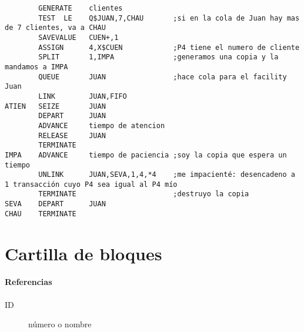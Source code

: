 \documentclass[12pt, a4paper, twoside]{paquetes-apunte/apunte}
\begin{document}
\begin{lstlisting}
        GENERATE    clientes
        TEST  LE    Q$JUAN,7,CHAU       ;si en la cola de Juan hay mas de 7 clientes, va a CHAU
        SAVEVALUE   CUEN+,1
        ASSIGN      4,X$CUEN            ;P4 tiene el numero de cliente
        SPLIT       1,IMPA              ;generamos una copia y la mandamos a IMPA
        QUEUE       JUAN                ;hace cola para el facility Juan
        LINK        JUAN,FIFO
ATIEN   SEIZE       JUAN
        DEPART      JUAN
        ADVANCE     tiempo de atencion
        RELEASE     JUAN
        TERMINATE
IMPA    ADVANCE     tiempo de paciencia ;soy la copia que espera un tiempo
        UNLINK      JUAN,SEVA,1,4,*4    ;me impacienté: desencadeno a 1 transacción cuyo P4 sea igual al P4 mío
        TERMINATE                       ;destruyo la copia
SEVA    DEPART      JUAN
CHAU    TERMINATE
\end{lstlisting}


\newpage

\section{Cartilla de bloques}

\paragraph{Referencias}
\begin{description}
  \item[ID] número o nombre
\end{description}

\newcommand{\bloquetitle}[1]{\texttt{#1}}
\newcommand{\bloquesintax}[1]{\paragraph{Bloque} \texttt{#1} \\}
\newcommand{\accion}[1]{\paragraph{Acción que representa} #1 \\}
\newcommand{\parametros}[1]{\paragraph{Parámetros} #1}
\newcommand{\paramtitle}[1]{\texttt{#1}:}
\newcommand{\parametrosdefault}[1]{\paragraph{Parámetros por defecto} #1}
\end{document}
